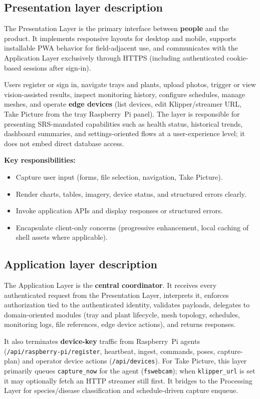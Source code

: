 \subsection{Presentation layer description}

The Presentation Layer is the primary interface between \textbf{people} and the product. It implements responsive layouts for desktop and mobile, supports installable PWA behavior for field-adjacent use, and communicates with the Application Layer exclusively through HTTPS (including authenticated cookie-based sessions after sign-in).

Users register or sign in, navigate trays and plants, upload photos, trigger or view vision-assisted results, inspect monitoring history, configure schedules, manage meshes, and operate \textbf{edge devices} (list devices, edit Klipper/streamer URL, Take Picture from the tray Raspberry~Pi panel). The layer is responsible for presenting SRS-mandated capabilities such as health status, historical trends, dashboard summaries, and settings-oriented flows at a user-experience level; it does not embed direct database access.

\textbf{Key responsibilities:}
\begin{itemize}
  \item Capture user input (forms, file selection, navigation, Take Picture).
  \item Render charts, tables, imagery, device status, and structured errors clearly.
  \item Invoke application APIs and display responses or structured errors.
  \item Encapsulate client-only concerns (progressive enhancement, local caching of shell assets where applicable).
\end{itemize}

\subsection{Application layer description}

The Application Layer is the \textbf{central coordinator}. It receives every authenticated request from the Presentation Layer, interprets it, enforces authorization tied to the authenticated identity, validates payloads, delegates to domain-oriented modules (tray and plant lifecycle, mesh topology, schedules, monitoring logs, file references, edge device actions), and returns responses.

It also terminates \textbf{device-key} traffic from Raspberry~Pi agents (\texttt{/api/raspberry-pi/register}, heartbeat, ingest, commands, poses, capture-plan) and operator device actions (\texttt{/api/devices}). For Take Picture, this layer primarily queues \texttt{capture\_now} for the agent (\texttt{fswebcam}); when \texttt{klipper\_url} is set it may optionally fetch an HTTP streamer still first. It bridges to the Processing Layer for species/disease classification and schedule-driven capture enqueue.

